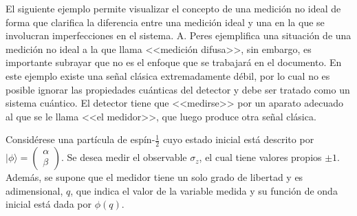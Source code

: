 El siguiente ejemplo permite visualizar el concepto de una medición no ideal de forma que clarifica la diferencia entre una medición ideal y una en la que se involucran imperfecciones en el sistema.
A. Peres {\cite{peres1997quantum}} ejemplifica una situación de una medición no
ideal a la que llama <<medición difusa>>, sin embargo, es importante subrayar
que no es el enfoque que se trabajará en el documento. En este ejemplo existe
una señal clásica extremadamente débil, por lo cual no es posible ignorar las propiedades cuánticas del detector y debe ser tratado como un sistema cuántico. %
 El detector  tiene que <<medirse>> por un aparato adecuado al que se le llama <<el medidor>>, que luego produce otra señal clásica.%


Considérese una partícula de espín-$\frac{1}{2}$ cuyo estado inicial está descrito por $|\phi\rangle=\begin{pmatrix}\alpha\\\beta\end{pmatrix}$. Se desea medir el observable $\sigma_z$, el cual tiene valores propios $\pm 1$. Además, se supone que el medidor tiene un solo grado de libertad y es adimensional, $q$, que indica el valor de la variable medida y su función de onda inicial está dada por $\phi(q)$.

